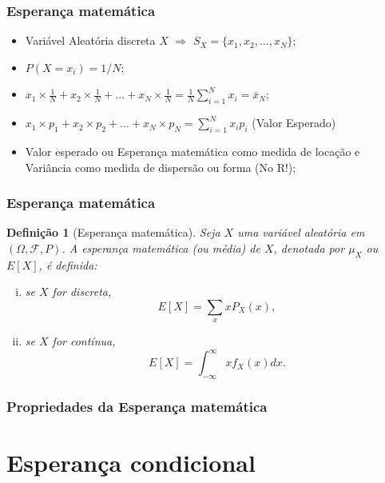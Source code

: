 \documentclass{beamer}
\theoremstyle{plain}
\newtheorem{defi}{Definição}
\begin{document}
  \begin{frame}
  	\frametitle{Esperança matemática}
  	\begin{itemize}
  		\item Variável Aleatória discreta $X$ $\Rightarrow$ $S_X = \{x_1, x_2, \ldots, x_N\}$;\pause
  		\item $P(X = x_i) = 1/N$;\pause
  		\item $x_1 \times \frac{1}{N} + x_2 \times \frac{1}{N} + \ldots + x_N \times \frac{1}{N} = \frac{1}{N}\sum_{i = 1}^{N}x_i = \bar{x}_N$;\pause
  		\item $x_1 \times p_1 + x_2 \times p_2 + \ldots + x_N \times p_N = \sum_{i = 1}^{N}x_ip_i$ (Valor Esperado)\pause
  		\item Valor esperado ou Esperança matemática como medida de locação e Variância como medida de dispersão ou forma (No R!);
  	\end{itemize}
  \end{frame}
  
  \begin{frame}
  	\frametitle{Esperança matemática}
  	\begin{defi}[Esperança matemática]\label{def:esperanca}
  		Seja $X$ uma variável aleatória em $(\Omega,\mathcal{F},P)$. A esperança matemática (ou média) de $X$, denotada por $\mu_X$ ou $E[X]$, é definida:
  		\begin{enumerate}[i)]
  			\item se $X$ for discreta,
  			\begin{equation}
  			E[X] = \sum_x x P_X(x),
  			 \end{equation}
  			\item se $X$ for contínua,
  			\begin{equation}
  			E[X] = \int^{\infty}_{-\infty} x f_X(x)dx.
  			\end{equation}
  		\end{enumerate}
  	\end{defi}
  \end{frame}
  
   \begin{frame}
   	\frametitle{Propriedades da Esperança matemática}
   	
   \end{frame}
  
  
\section{Esperança condicional}
\end{document}
